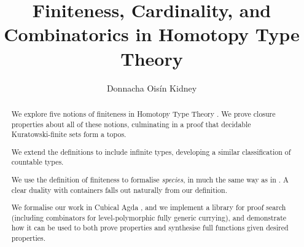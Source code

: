 
\title{Finiteness, Cardinality, and Combinatorics in Homotopy Type Theory}
\author{Donnacha Oisín Kidney}

\maketitle
\begin{abstract}
  We explore five notions of finiteness in Homotopy Type Theory \cite{hottbook}.
  We prove closure properties about all of these notions, culminating in a proof
  that decidable Kuratowski-finite sets form a topos.

  We extend the definitions to include infinite types, developing a similar
  classification of countable types.

  We use the definition of finiteness to formalise \emph{species}, in much
  the same way as in \cite{yorgeyCombinatorialSpeciesLabelled2014}.
  A clear duality with containers
  \cite{abbottContainersConstructingStrictly2005} falls out naturally from our
  definition.

  We formalise our work in Cubical Agda
  \cite{vezzosiCubicalAgdaDependently2019}, and we implement a library for proof
  search (including combinators for level-polymorphic fully generic currying),
  and demonstrate how it can be used to both prove properties and synthesise
  full functions given desired properties.
\end{abstract}


